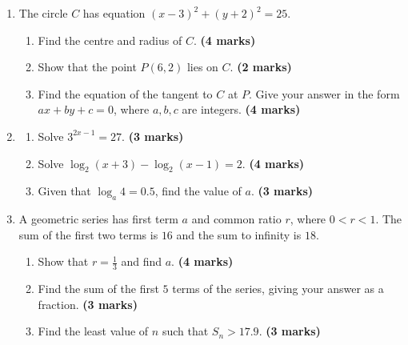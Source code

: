 \documentclass{../Templates/sbs-exam}
\newcommand{\imarks}[1]{\hfill \textbf{(#1 marks)}}
\begin{document}
\begin{enumerate}

\item %
The circle $C$ has equation $(x-3)^2 + (y+2)^2 = 25$.
\begin{enumerate}
    \item Find the centre and radius of $C$. \imarks{4}
    \item Show that the point $P(6,2)$ lies on $C$. \imarks{2}
    \item Find the equation of the tangent to $C$ at $P$. Give your answer in the form $ax+by+c=0$, where $a,b,c$ are integers. \imarks{4}
\end{enumerate}

\vspace{8cm}

\item %
\begin{enumerate}
    \item Solve $3^{2x-1} = 27$. \imarks{3}
    \item Solve $\log_2(x+3) - \log_2(x-1) = 2$. \imarks{4}
    \item Given that $\log_a 4 = 0.5$, find the value of $a$. \imarks{3}
\end{enumerate}

\vspace{12cm}

\item %
A geometric series has first term $a$ and common ratio $r$, where $0<r<1$. The sum of the first two terms is $16$ and the sum to infinity is $18$.
\begin{enumerate}
    \item Show that $r = \frac{1}{3}$ and find $a$. \imarks{4}
    \item Find the sum of the first $5$ terms of the series, giving your answer as a fraction. \imarks{3}
    \item Find the least value of $n$ such that $S_n > 17.9$. \imarks{3}
\end{enumerate}


\end{enumerate}
\end{document}
